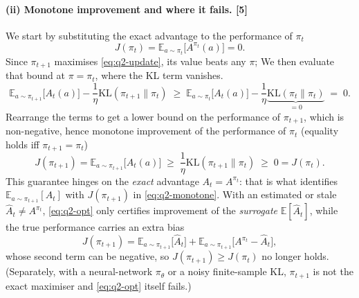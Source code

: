\documentclass[11pt,a4paper]{article}
\begin{document}
\paragraph{(ii) Monotone improvement and where it fails. \hfill\textnormal{[5]}}
We start by substituting the exact advantage to the performance of $\pi_t$
\begin{equation}
  J(\pi_t)=\mathbb{E}_{a\sim\pi_t}\!\bigl[A^{\pi_t}(a)\bigr]=0 .
  \label{eq:q2-baseline}
\end{equation}
Since $\pi_{t+1}$ maximises \eqref{eq:q2-update}, its value beats any $\pi$;
We then evaluate that bound at $\pi=\pi_t$, where the KL term vanishes.
\begin{equation}
  \mathbb{E}_{a\sim\pi_{t+1}}\!\bigl[A_t(a)\bigr]-\frac1\eta\mathrm{KL}(\pi_{t+1}\|\pi_t)
  \;\ge\;
  \mathbb{E}_{a\sim\pi_t}\!\bigl[A_t(a)\bigr]-\frac1\eta\underbrace{\mathrm{KL}(\pi_t\|\pi_t)}_{=0}
  \;=\;0 .
  \label{eq:q2-opt}
\end{equation}
Rearrange the terms to get a lower bound on the performance of $\pi_{t+1}$, which is non-negative, hence 
monotone improvement of the performance of $\pi_t$ (equality holds iff $\pi_{t+1}=\pi_t$)
\begin{equation}
  J(\pi_{t+1})=\mathbb{E}_{a\sim\pi_{t+1}}\!\bigl[A_t(a)\bigr]
  \;\ge\;\frac1\eta\mathrm{KL}(\pi_{t+1}\|\pi_t)\;\ge\;0=J(\pi_t).
  \label{eq:q2-monotone}
\end{equation}
This guarantee hinges on the \emph{exact} advantage $A_t=A^{\pi_t}$: that is what identifies
$\mathbb{E}_{a\sim\pi_{t+1}}[A_t]$ with $J(\pi_{t+1})$ in \eqref{eq:q2-monotone}. With an estimated or
stale $\hat A_t\neq A^{\pi_t}$, \eqref{eq:q2-opt} only certifies improvement of the \emph{surrogate}
$\mathbb{E}[\hat A_t]$, while the true performance carries an extra bias
\begin{equation}
  J(\pi_{t+1})=\mathbb{E}_{a\sim\pi_{t+1}}\!\bigl[\hat A_t\bigr]
  +\mathbb{E}_{a\sim\pi_{t+1}}\!\bigl[A^{\pi_t}-\hat A_t\bigr],
  \label{eq:q2-bias}
\end{equation}
whose second term can be negative, so $J(\pi_{t+1})\ge J(\pi_t)$ no longer holds. (Separately, with a
neural-network $\pi_\theta$ or a noisy finite-sample KL, $\pi_{t+1}$ is not the exact maximiser and
\eqref{eq:q2-opt} itself fails.)
\end{document}
